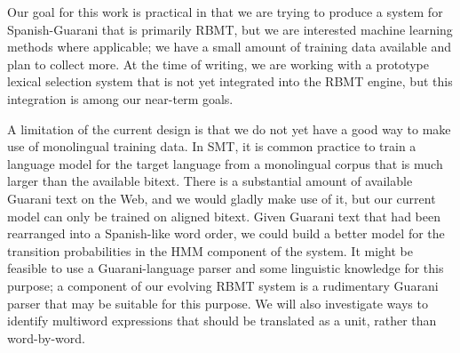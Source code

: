 \documentclass[11pt]{article}
\begin{document}
Our goal for this work is practical in that we are trying to produce a
system for Spanish-Guarani that is primarily RBMT, but we are interested machine
learning methods where applicable; we have a small amount of training data
available and plan to collect more.  At the time of writing, we are working
with a prototype lexical selection system that is not yet integrated into the
RBMT engine, but this integration is among our near-term goals.

A limitation of the current design is that we do not yet have a good way to
make use of monolingual training data. In SMT, it is common practice to train a
language model for the target language from a monolingual corpus that is much
larger than the available bitext. There is a substantial amount of available
Guarani text on the Web, and we would gladly make use of it, but our current
model can only be trained on aligned bitext.  Given Guarani text that had been
rearranged into a Spanish-like word order, we could build a better model for
the transition probabilities in the HMM component of the system. It might be
feasible to use a Guarani-language parser and some linguistic knowledge for
this purpose; a component of our evolving RBMT system is a rudimentary
Guarani parser that may be suitable for this purpose.
We will also investigate ways to identify multiword expressions that should be
translated as a unit, rather than word-by-word.


{}
\end{document}
